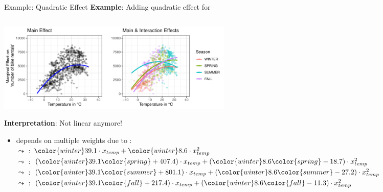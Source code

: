 \documentclass[11pt,compress,t,notes=noshow, aspectratio=169, xcolor=table]{beamer}
\begin{document}
\begin{frame}{Example: Quadratic Effect}
\textbf{Example}: Adding quadratic effect for  
\begin{columns}[T, totalwidth=\textwidth]
\begin{column}{0.685\textwidth}
\includegraphics[width=0.5\textwidth, trim=0cm 0.1cm 10.4cm 0cm, clip]{figure/poly_main_vs_interaction_effects.pdf}

\textbf{Interpretation}: Not linear anymore!
\begin{itemize}
    \item<2>  depends on multiple weights due to :\\
    $\leadsto$ : ${\color{winter}39.1} \cdot x_{temp} + {\color{winter}8.6} \cdot x_{temp}^2$ \\
    $\leadsto$ : 
    $({\color{winter}39.1} {\color{spring}+407.4}) \cdot x_{temp} + ({\color{winter}8.6} {\color{spring} - 18.7}) \cdot x_{temp}^2$ \\
    $\leadsto$ : $({\color{winter}39.1}  {\color{summer}+801.1}) \cdot x_{temp} + ({\color{winter}8.6} {\color{summer} - 27.2}) \cdot x_{temp}^2$  \\
    $\leadsto$ : $({\color{winter}39.1}  {\color{fall}+217.4}) \cdot x_{temp} + ({\color{winter}8.6} {\color{fall} - 11.3}) \cdot x_{temp}^2$ 
\end{itemize}


\end{column}
\end{columns}
\end{frame}
\end{document}
